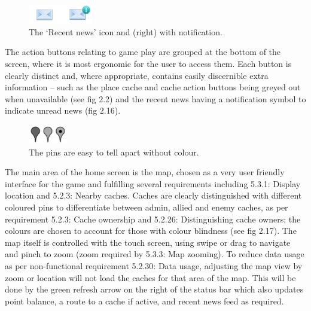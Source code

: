 \begin{figure}
	\vspace{-45pt}
	\begin{center}
	\includegraphics[width=0.25\textwidth]{images/news_icons}
	\caption{The `Recent news' icon and (right) with notification.}
	\label{news_icons}
	\end{center}
	\vspace{15pt}
\end{figure}

The action buttons relating to game play are grouped at the bottom of the screen, where it is most ergonomic for the user to access them. Each button is clearly distinct and, where appropriate, contains easily discernible extra information – such as the place cache and cache action buttons being greyed out when unavailable (see fig 2.2) and the recent news having a notification symbol to indicate unread news (fig 2.16). 

\begin{figure}
	\vspace{-20pt}
	\begin{center}
	\includegraphics[width=0.15\textwidth]{images/grey_pins}
	\caption{The pins are easy to tell apart without colour.}
	\label{grey_pins}
	\end{center}
	\vspace{-20pt}
\end{figure}

The main area of the home screen is the map, chosen as a very user friendly interface for the game and fulfilling several requirements including 5.3.1: Display location and 5.2.3: Nearby caches. Caches are clearly distinguished with different coloured pins to differentiate between admin, allied and enemy caches, as per requirement 5.2.3: Cache ownership and 5.2.26: Distinguishing cache owners; the colours are chosen to account for those with colour blindness (see fig 2.17). The map itself is controlled with the touch screen, using swipe or drag to navigate and pinch to zoom (zoom required by 5.3.3: Map zooming). To reduce data usage as per non-functional requirement 5.2.30: Data usage, adjusting the map view by zoom or location will not load the caches for that area of the map. This will be done by the green refresh arrow on the right of the status bar which also updates point balance, a route to a cache if active, and recent news feed as required.

